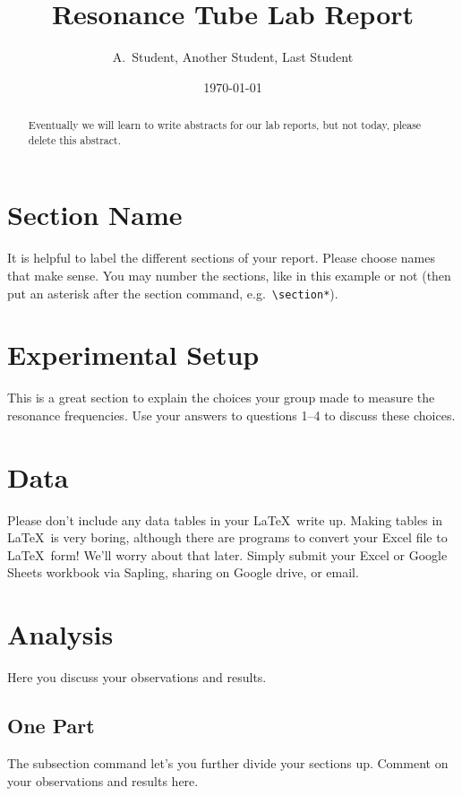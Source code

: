 \documentclass[12pt]{article}
\begin{document}
\title{Resonance Tube Lab Report}
\author{A.~Student, Another Student, Last Student}
\date{\today}

\maketitle

\begin{abstract}
	Eventually we will learn to write abstracts for our lab reports, but not today, please delete this abstract.
\end{abstract}

\section{Section Name}
	It is helpful to label the different sections of your report.
    Please choose names that make sense.  You may number the sections, like in this example or not (then put an asterisk after the section command, e.g.~\verb+\section*+). 
    
    
\section{Experimental Setup}
	This is a great section to explain the choices your group made to measure the resonance frequencies.  Use your answers to questions 1--4 to discuss these choices.
    
\section{Data}
	Please don't include any data tables in your \LaTeX\, write up.  Making tables in \LaTeX\, is very boring, although there are programs to convert your Excel file to \LaTeX\, form!  We'll worry about that later.  Simply submit your Excel or Google Sheets workbook via Sapling, sharing on Google drive, or email.
    

\section{Analysis}
	Here you discuss your observations and results.
	
    \subsection{One Part}
		The subsection command let's you further divide your sections up.  Comment on your observations and results here.
        
\end{document}
